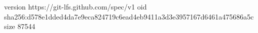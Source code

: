 version https://git-lfs.github.com/spec/v1
oid sha256:d578e1dded4da7e9eca824719c6ead4eb9411a3d3e3957167d6461a475686a5c
size 87544
